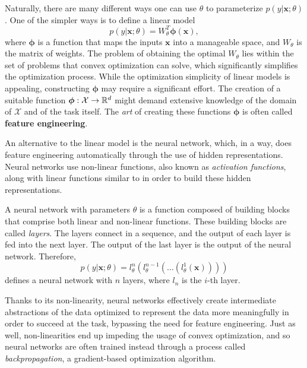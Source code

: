Naturally, there are many different ways one can use $\theta$ to
parameterize $p\left(y|\bm{x};\theta\right)$. One of the simpler ways
is to define a linear model
%
\begin{equation}
    p\left(y|\bm{x};\theta\right)=W_{\theta}^T\bm{\phi}\left(\bm{x}\right),
    \label{eq:linear}
\end{equation}
%
where $\bm{\phi}$ is a function that maps the inputs $\bm{x}$ into a
manageable space, and $W_{\theta}$ is the matrix of weights. The
problem of obtaining the optimal $W_{\theta}$ lies within the set of
problems that convex optimization can solve, which significantly
simplifies the optimization process. While the optimization
simplicity of linear models is appealing, constructing $\bm{\phi}$
may require a significant effort. The creation of a suitable function
$\bm{\phi}: \mathcal{X} \rightarrow \mathbb{R}^d$ might demand extensive
knowledge of the domain of $\mathcal{X}$ and of the task itself. The
\textit{art} of creating these functions $\bm{\phi}$ is often called
\textbf{feature engineering}.

An alternative to the linear model is the neural network, which, in a
way, does feature engineering automatically through the use of hidden
representations. Neural networks use non-linear functions, also known
as \textit{activation functions}, along with linear functions similar
to  in order to build these hidden representations.

\begin{definition}
    A neural network with parameters $\theta$ is a function
    composed of building blocks that comprise both linear and non-linear
    functions. These building blocks are called \textit{layers}.
    The layers connect in a sequence, and the output of each
    layer is fed into the next layer. The output of the last layer is
    the output of the neural network. Therefore,
    \begin{equation}
        p\left(y|\bm{x};\theta\right)=l_\theta^{n}\left(l_\theta^{n-1}\left(\dots\left(l_\theta^{1}\left(\bm{x}\right)\right)\right)\right)
    \end{equation}
    defines a neural network with $n$ layers, where $l_n$ is the
    $i$-th layer.
\end{definition}

Thanks to its non-linearity, neural networks effectively create
intermediate abstractions of the data optimized to
represent the data more meaningfully in order to succeed at the task, bypassing the need
for feature engineering. Just as well, non-linearities end up
impeding the usage of convex optimization, and so neural networks
are often trained instead through a process called \textit{backpropagation},
a gradient-based optimization algorithm.

